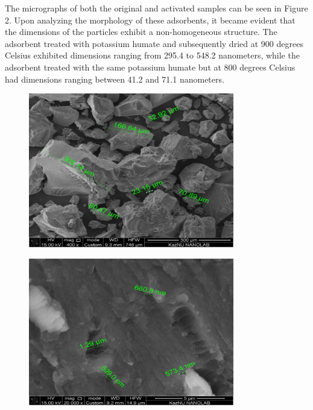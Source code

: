The micrographs of both the original and activated samples can be seen
in Figure 2. Upon analyzing the morphology of these adsorbents, it
became evident that the dimensions of the particles exhibit a
non-homogeneous structure. The adsorbent treated with potassium humate
and subsequently dried at 900 degrees Celsius exhibited dimensions
ranging from 295.4 to 548.2 nanometers, while the adsorbent treated with
the same potassium humate but at 800 degrees Celsius had dimensions
ranging between 41.2 and 71.1 nanometers.

\begin{figure}[H]
	\centering
	\includegraphics[width=0.8\textwidth]{media/chem2/image93.tiff}
	\caption*{}
\end{figure}

\begin{figure}[H]
	\centering
	\includegraphics[width=0.8\textwidth]{media/chem2/image94.tiff}
	\caption*{}
\end{figure}

